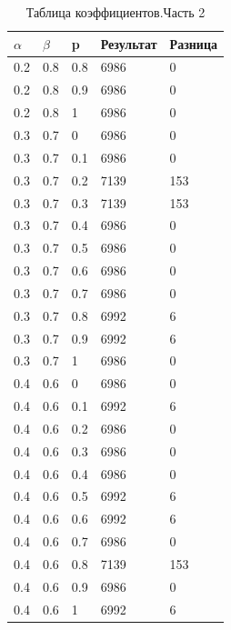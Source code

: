 \documentclass[12pt,a4paper]{report}
\begin{document}
\begin{table}[ht!]
	\centering
	\caption{Таблица коэффициентов.Часть 2}
	\label{table:ref2}
	\begin{tabular}{ | l | l | l | l | l |}
		\hline
		$\alpha$ & $\beta$ & p   & Результат & Разница \\
		\hline
		
		0.2      & 0.8     & 0.8 & 6986      & 0       \\
		0.2      & 0.8     & 0.9 & 6986      & 0       \\
		0.2      & 0.8     & 1   & 6986      & 0       \\
		0.3      & 0.7     & 0   & 6986      & 0       \\
		0.3      & 0.7     & 0.1 & 6986      & 0       \\
		0.3      & 0.7     & 0.2 & 7139      & 153     \\
		0.3      & 0.7     & 0.3 & 7139      & 153     \\
		0.3      & 0.7     & 0.4 & 6986      & 0       \\
		0.3      & 0.7     & 0.5 & 6986      & 0       \\
		0.3      & 0.7     & 0.6 & 6986      & 0       \\
		0.3      & 0.7     & 0.7 & 6986      & 0       \\
		0.3      & 0.7     & 0.8 & 6992      & 6       \\
		0.3      & 0.7     & 0.9 & 6992      & 6       \\
		0.3      & 0.7     & 1   & 6986      & 0       \\
		0.4      & 0.6     & 0   & 6986      & 0       \\
		0.4      & 0.6     & 0.1 & 6992      & 6       \\
		0.4      & 0.6     & 0.2 & 6986      & 0       \\
		0.4      & 0.6     & 0.3 & 6986      & 0       \\
		0.4      & 0.6     & 0.4 & 6986      & 0       \\
		0.4      & 0.6     & 0.5 & 6992      & 6       \\
		0.4      & 0.6     & 0.6 & 6992      & 6       \\
		0.4      & 0.6     & 0.7 & 6986      & 0       \\
		0.4      & 0.6     & 0.8 & 7139      & 153     \\
		0.4      & 0.6     & 0.9 & 6986      & 0       \\
		0.4      & 0.6     & 1   & 6992      & 6       \\

\end{tabular}
\end{table}
\end{document}
